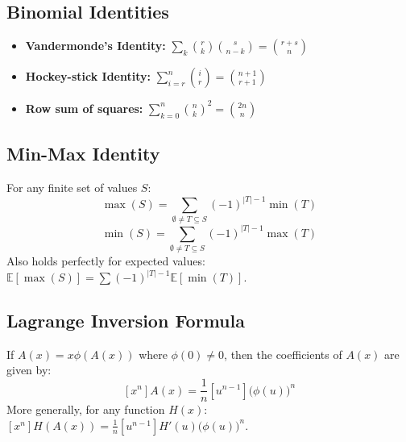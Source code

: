 	\subsection{Binomial Identities}
        \begin{itemize}[noitemsep]
            \item \textbf{Vandermonde's Identity:} $\sum_{k} \binom{r}{k}\binom{s}{n-k} = \binom{r+s}{n}$
            \item \textbf{Hockey-stick Identity:} $\sum_{i=r}^n \binom{i}{r} = \binom{n+1}{r+1}$
            \item \textbf{Row sum of squares:} $\sum_{k=0}^n \binom{n}{k}^2 = \binom{2n}{n}$
        \end{itemize}
	
	\subsection{Min-Max Identity}
        For any finite set of values $S$:
        \[ \max(S) = \sum_{\emptyset \neq T \subseteq S} (-1)^{|T|-1} \min(T) \]
        \[ \min(S) = \sum_{\emptyset \neq T \subseteq S} (-1)^{|T|-1} \max(T) \]
        Also holds perfectly for expected values: $\mathbb{E}[\max(S)] = \sum (-1)^{|T|-1} \mathbb{E}[\min(T)]$.
	
	\subsection{Lagrange Inversion Formula}
        If $A(x) = x \phi(A(x))$ where $\phi(0) \neq 0$, then the coefficients of $A(x)$ are given by:
        \[ [x^n] A(x) = \frac{1}{n} [u^{n-1}] \big(\phi(u)\big)^n \]
        More generally, for any function $H(x)$: $[x^n] H(A(x)) = \frac{1}{n} [u^{n-1}] H'(u) \big(\phi(u)\big)^n$.
